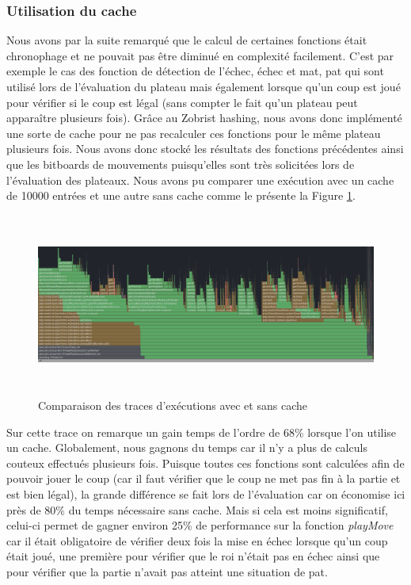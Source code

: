 \documentclass{article}
\begin{document}
\subsubsection{Utilisation du cache}
 Nous avons par la suite
remarqué que le calcul de certaines fonctions était chronophage et ne pouvait pas être diminué en complexité facilement. C'est par exemple le cas des fonction de détection de
l'échec, échec et mat, pat qui sont utilisé lors de l'évaluation du plateau mais également lorsque qu'un coup est joué pour vérifier si le coup est légal (sans compter le fait
qu'un plateau peut apparaître plusieurs fois). Grâce au Zobrist hashing, nous avons donc implémenté une sorte de cache pour ne pas recalculer ces fonctions pour le même plateau
plusieurs fois. Nous avons donc stocké les résultats des fonctions précédentes ainsi que les bitboards de mouvements puisqu'elles sont très solicitées lors de l'évaluation des
plateaux. Nous avons pu comparer une exécution avec un cache de 10000 entrées et une autre sans cache comme le présente la Figure \ref{cache_cmp}.

\begin{figure}[h]
    \centering
    \includegraphics[width=\textwidth,height=6.0cm,keepaspectratio]{cache_compare.png}
    \caption{Comparaison des traces d'exécutions avec et sans cache}
    \label{cache_cmp}
\end{figure}
\FloatBarrier

Sur cette trace on remarque un gain temps de l'ordre de 68\% lorsque l'on utilise un cache. Globalement, nous gagnons du temps car il n'y a plus de calculs couteux
effectués plusieurs fois. Puisque toutes ces fonctions sont calculées afin de pouvoir jouer le coup (car il faut vérifier que le coup ne met pas fin à la partie et 
est bien légal), la grande différence se fait lors de l'évaluation car on économise ici près de 80\% du temps nécessaire sans cache. Mais si cela est moins significatif,
celui-ci permet de gagner environ 25\% de performance sur la fonction \textit{playMove} car il était obligatoire de vérifier deux fois la mise en échec lorsque qu'un coup était joué,
une première pour vérifier que le roi n'était pas en échec ainsi que pour vérifier que la partie n'avait pas atteint une situation de pat.\\
\end{document}
